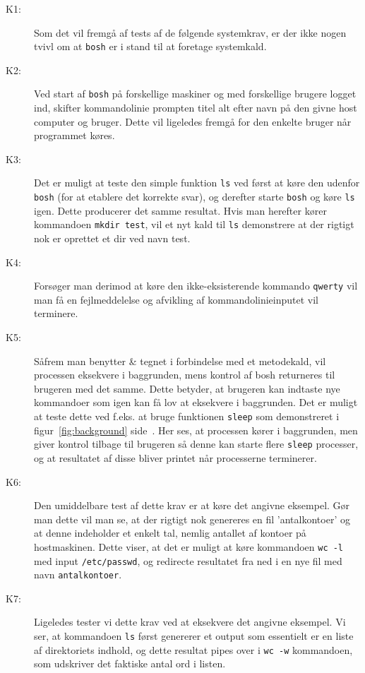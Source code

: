\documentclass{article}
\begin{document}
\begin{description}
\item[K1:] Som det vil fremgå af tests af de følgende systemkrav, er der ikke nogen tvivl om at \texttt{bosh} er i stand til at foretage systemkald.

\item[K2:] Ved start af \texttt{bosh} på forskellige maskiner og med forskellige brugere logget ind, skifter kommandolinie prompten titel alt efter navn på den givne host computer og bruger. Dette vil ligeledes fremgå for den enkelte bruger når programmet køres.

\item[K3:] Det er muligt at teste den simple funktion \texttt{ls} ved først at køre den udenfor \texttt{bosh} (for at etablere det korrekte svar), og derefter starte \texttt{bosh} og køre \texttt{ls} igen. Dette producerer det samme resultat. Hvis man herefter kører kommandoen \texttt{mkdir test}, vil et nyt kald til \texttt{ls} demonstrere at der rigtigt nok er oprettet et dir ved navn test.

\item[K4:] Forsøger man derimod at køre den ikke-eksisterende kommando \texttt{qwerty} vil man få en fejlmeddelelse og afvikling af kommandolinieinputet vil terminere.

\item[K5:] Såfrem man benytter \& tegnet i forbindelse med et metodekald, vil processen eksekvere i baggrunden, mens kontrol af bosh returneres til brugeren med det samme. Dette betyder, at brugeren kan indtaste nye kommandoer som igen kan få lov at eksekvere i baggrunden. Det er muligt at teste dette ved f.eks. at bruge funktionen \texttt{sleep} som demonstreret i figur~\ref{fig:background} side~\pageref{fig:background}. Her ses, at processen kører i baggrunden, men giver kontrol tilbage til brugeren så denne kan starte flere \texttt{sleep} processer, og at resultatet af disse bliver printet når processerne terminerer. 

\item[K6:] Den umiddelbare test af dette krav er at køre det angivne eksempel. Gør man dette vil man se, at der rigtigt nok genereres en fil 'antalkontoer' og at denne indeholder et enkelt tal, nemlig antallet af kontoer på hostmaskinen. Dette viser, at det er muligt at køre kommandoen \texttt{wc -l}  med input \texttt{/etc/passwd}, og redirecte resultatet fra ned i en nye fil med navn \texttt{antalkontoer}.

\item[K7:] Ligeledes tester vi dette krav ved at eksekvere det angivne eksempel. Vi ser, at kommandoen \texttt{ls} først genererer et output som essentielt er en liste af direktoriets indhold, og dette resultat pipes over i \texttt{wc -w} kommandoen, som udskriver det faktiske antal ord i listen. 


\end{description}
\end{document}
